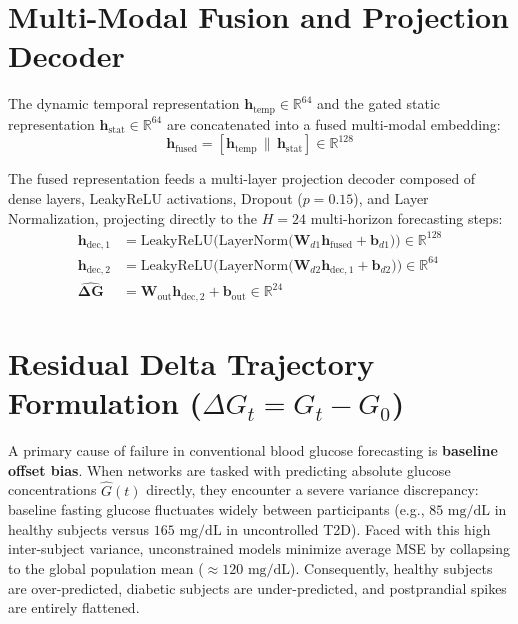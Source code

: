 \section{Multi-Modal Fusion and Projection Decoder}
The dynamic temporal representation $\mathbf{h}_{\text{temp}} \in \mathbb{R}^{64}$ and the gated static representation $\mathbf{h}_{\text{stat}} \in \mathbb{R}^{64}$ are concatenated into a fused multi-modal embedding:
\begin{equation}
    \mathbf{h}_{\text{fused}} = [\mathbf{h}_{\text{temp}} \,\|\, \mathbf{h}_{\text{stat}}] \in \mathbb{R}^{128}
\end{equation}

The fused representation feeds a multi-layer projection decoder composed of dense layers, LeakyReLU activations, Dropout ($p=0.15$), and Layer Normalization, projecting directly to the $H = 24$ multi-horizon forecasting steps:
\begin{align}
    \mathbf{h}_{\text{dec}, 1} &= \text{LeakyReLU}\Big(\text{LayerNorm}\big(\mathbf{W}_{d1} \mathbf{h}_{\text{fused}} + \mathbf{b}_{d1}\big)\Big) \in \mathbb{R}^{128} \\
    \mathbf{h}_{\text{dec}, 2} &= \text{LeakyReLU}\Big(\text{LayerNorm}\big(\mathbf{W}_{d2} \mathbf{h}_{\text{dec}, 1} + \mathbf{b}_{d2}\big)\Big) \in \mathbb{R}^{64} \\
    \hat{\boldsymbol{\Delta \mathbf{G}}} &= \mathbf{W}_{\text{out}} \mathbf{h}_{\text{dec}, 2} + \mathbf{b}_{\text{out}} \in \mathbb{R}^{24}
\end{align}

\section{Residual Delta Trajectory Formulation ($\Delta G_t = G_t - G_0$)}
A primary cause of failure in conventional blood glucose forecasting is \textbf{baseline offset bias}. When networks are tasked with predicting absolute glucose concentrations $\hat{G}(t)$ directly, they encounter a severe variance discrepancy: baseline fasting glucose fluctuates widely between participants (e.g., $85\text{ mg/dL}$ in healthy subjects versus $165\text{ mg/dL}$ in uncontrolled T2D). Faced with this high inter-subject variance, unconstrained models minimize average MSE by collapsing to the global population mean ($\approx 120\text{ mg/dL}$). Consequently, healthy subjects are over-predicted, diabetic subjects are under-predicted, and postprandial spikes are entirely flattened.

